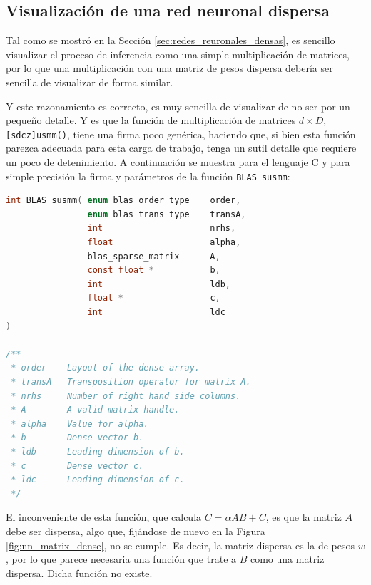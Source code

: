 \subsection{Visualización de una red neuronal dispersa}
\label{ssec:visualizacion_nn_dispersa}
Tal como se mostró en la Sección \ref{sec:redes_reuronales_densas}, es sencillo visualizar el proceso de inferencia como una simple multiplicación de matrices, por lo que una multiplicación con una matriz de pesos dispersa debería ser sencilla de visualizar de forma similar.

Y este razonamiento es correcto, es muy sencilla de visualizar de no ser por un pequeño detalle. Y es que la función de multiplicación de matrices $d\times D$, \texttt{[sdcz]usmm()}, tiene una firma poco genérica, haciendo que, si bien esta función parezca adecuada para esta carga de trabajo, tenga un sutil detalle que requiere un poco de detenimiento. A continuación se muestra para el lenguaje C y para simple precisión la firma y parámetros de la función \texttt{BLAS\_susmm}:

\begin{lstlisting}[language=C]
int BLAS_susmm( enum blas_order_type    order,
                enum blas_trans_type    transA,
                int                     nrhs,
                float                   alpha,
                blas_sparse_matrix      A,
                const float *           b,
                int                     ldb,
                float *                 c,
                int                     ldc 
)

/**
 * order    Layout of the dense array.
 * transA   Transposition operator for matrix A.
 * nrhs     Number of right hand side columns.
 * A        A valid matrix handle.
 * alpha    Value for alpha.
 * b        Dense vector b.
 * ldb      Leading dimension of b.
 * c        Dense vector c.
 * ldc      Leading dimension of c.
 */
\end{lstlisting}

El inconveniente de esta función, que calcula $C = \alpha AB + C$, es que la matriz $A$ debe ser dispersa, algo que, fijándose de nuevo en la Figura \ref{fig:nn_matrix_dense}, no se cumple. Es decir, la matriz dispersa es la de pesos $w$, por lo que parece necesaria una función que trate a $B$ como una matriz dispersa. Dicha función no existe.

